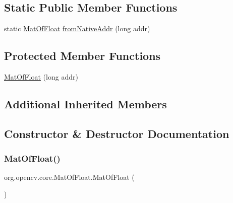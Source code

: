 \subsection*{Static Public Member Functions}
\begin{DoxyCompactItemize}
\item 
static \mbox{\hyperlink{classorg_1_1opencv_1_1core_1_1_mat_of_float}{Mat\+Of\+Float}} \mbox{\hyperlink{classorg_1_1opencv_1_1core_1_1_mat_of_float_ab94c586811ff9a2d8d6a221d2aac201c}{from\+Native\+Addr}} (long addr)
\end{DoxyCompactItemize}
\subsection*{Protected Member Functions}
\begin{DoxyCompactItemize}
\item 
\mbox{\hyperlink{classorg_1_1opencv_1_1core_1_1_mat_of_float_a32e513a7a3b402c9e9ac7aed684eaea9}{Mat\+Of\+Float}} (long addr)
\end{DoxyCompactItemize}
\subsection*{Additional Inherited Members}


\subsection{Constructor \& Destructor Documentation}
\mbox{\label{classorg_1_1opencv_1_1core_1_1_mat_of_float_ae7fb4b429ea3c460719c8015d9a7b78a}} 
\subsubsection{\texorpdfstring{Mat\+Of\+Float()}{MatOfFloat()}\hspace{0.1cm}{\footnotesize\ttfamily [1/4]}}
{\footnotesize\ttfamily org.\+opencv.\+core.\+Mat\+Of\+Float.\+Mat\+Of\+Float (\begin{DoxyParamCaption}{ }\end{DoxyParamCaption})}

\mbox{\label{classorg_1_1opencv_1_1core_1_1_mat_of_float_a32e513a7a3b402c9e9ac7aed684eaea9}} 
